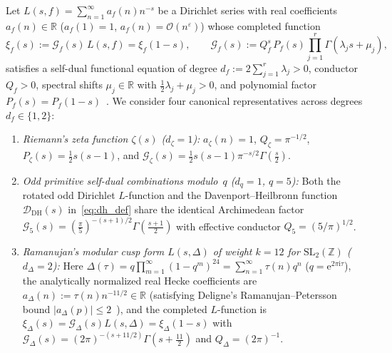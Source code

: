 \documentclass[11pt,reqno]{amsart}
\theoremstyle{definition}
\theoremstyle{remark}
\numberwithin{equation}{section}
\newcommand{\R}{\mathbb{R}}
\newcommand{\Z}{\mathbb{Z}}
\newcommand{\ee}{\mathrm{e}}
\newcommand{\ii}{\mathrm{i}}
\newcommand{\DHf}{\mathrm{DH}}
\begin{document}
Let $L(s,f) = \sum_{n=1}^\infty a_f(n)n^{-s}$ be a Dirichlet series with real coefficients $a_f(n) \in \R$ ($a_f(1) = 1$, $a_f(n) = \mathcal{O}(n^\varepsilon)$) whose completed function
\begin{equation}\label{eq:selberg_completed}
\xi_f(s) := \mathcal{G}_f(s)\,L(s,f) = \xi_f(1 - s), \qquad \mathcal{G}_f(s) := Q_f^s\,P_f(s)\prod_{j=1}^{r}\Gamma(\lambda_j s + \mu_j),
\end{equation}
satisfies a self-dual functional equation of degree $d_f := 2\sum_{j=1}^r \lambda_j > 0$, conductor $Q_f > 0$, spectral shifts $\mu_j \in \R$ with $\frac{1}{2}\lambda_j + \mu_j > 0$, and polynomial factor $P_f(s) = P_f(1-s)$~\cite{selberg1992}. We consider four canonical representatives across degrees $d_f \in \{1, 2\}$:
\begin{enumerate}[label=\textup{(\alph*)},leftmargin=2.2em]
\item \textit{Riemann's zeta function $\zeta(s)$ ($d_\zeta = 1$):} $a_\zeta(n) = 1$, $Q_\zeta = \pi^{-1/2}$, $P_\zeta(s) = \frac{1}{2}s(s-1)$, and $\mathcal{G}_\zeta(s) = \frac{1}{2}s(s-1)\pi^{-s/2}\Gamma(\frac{s}{2})$.
\item \textit{Odd primitive self-dual combinations modulo~$q$ ($d_q = 1$, $q = 5$):} Both the rotated odd Dirichlet $L$-function and the Davenport--Heilbronn function $\mathcal{D}_{\DHf}(s)$ in~\eqref{eq:dh_def} share the identical Archimedean factor $\mathcal{G}_5(s) = (\frac{\pi}{5})^{-(s+1)/2}\Gamma(\frac{s+1}{2})$ with effective conductor $Q_5 = (5/\pi)^{1/2}$.
\item \textit{Ramanujan's modular cusp form $L(s, \Delta)$ of weight $k = 12$ for $\mathrm{SL}_2(\Z)$ ($d_\Delta = 2$):} Here $\Delta(\tau) = q\prod_{m=1}^\infty (1 - q^m)^{24} = \sum_{n=1}^\infty \tau(n)q^n$ ($q = \ee^{2\pi\ii\tau}$), the analytically normalized real Hecke coefficients are $a_\Delta(n) := \tau(n)n^{-11/2} \in \R$ (satisfying Deligne's Ramanujan--Petersson bound $|a_\Delta(p)| \le 2$~\cite{deligne1974}), and the completed $L$-function is $\xi_\Delta(s) = \mathcal{G}_\Delta(s)L(s,\Delta) = \xi_\Delta(1-s)$ with $\mathcal{G}_\Delta(s) = (2\pi)^{-(s+11/2)}\Gamma(s + \frac{11}{2})$ and $Q_\Delta = (2\pi)^{-1}$.
\end{enumerate}
\end{document}
